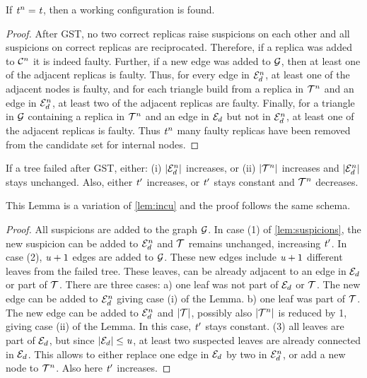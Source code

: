 \begin{lemma}
  \label{lem:found}
  If $\mathit{t}^n=\mathit{t}$, then a working configuration is found.
\end{lemma}
\begin{proof}
  After GST, no two correct replicas raise suspicions on each other and all suspicions on correct replicas are reciprocated. Therefore, if a replica was added to $\mathcal{C}^n$ it is indeed faulty.
  Further, if a new edge was added to $\mathcal{G}$, then at least one of the adjacent replicas is faulty.
  Thus, for every edge in $\mathcal{E}_d^n$, at least one of the adjacent nodes is faulty, and for each triangle build from a replica in $\mathcal{T}^n$ and an edge in $\mathcal{E}_d^n$, at least two of the adjacent replicas are faulty.
  Finally, for a triangle in $\mathcal{G}$ containing a replica in $\mathcal{T}^n$ and an edge in $\mathcal{E}_d$ but not in $\mathcal{E}_d^n$, at least one of the adjacent replicas is faulty.
  Thus $\mathit{t}^n$ many faulty replicas have been removed from the candidate set for internal nodes.
\end{proof}



\begin{lemma}
  \label{lem:incugst}
  If a tree failed after GST, either: (i) $|\mathcal{E}_d^n|$ increases, or (ii) $|\mathcal{T}^n|$ increases and $|\mathcal{E}_d^n|$ stays unchanged.
  Also, either $\mathit{t}'$ increases, or $\mathit{t}'$ stays constant and $\mathcal{T}^n$ decreases.
\end{lemma}
This Lemma is a variation of \cref{lem:incu} and the proof follows the same schema.

\begin{proof}
  All suspicions are added to the graph $\mathcal{G}$.
  In case (1) of \cref{lem:suspicions}, the new suspicion can be added to $\mathcal{E}_d^n$ and $\mathcal{T}$ remains unchanged, increasing $\mathit{t}'$.
  In case (2), $\mathit{u}+1$ edges are added to $\mathcal{G}$.
  These new edges include $\mathit{u}+1$ different leaves from the failed tree. These leaves, can be already adjacent to an edge in $\mathcal{E}_d$ or part of $\mathcal{T}$.
  There are three cases:
a) one leaf was not part of $\mathcal{E}_d$ or $\mathcal{T}$. The new edge can be added to $\mathcal{E}_d^n$ giving case (i) of the Lemma.
b) one leaf was part of $\mathcal{T}$. The new edge can be added to $\mathcal{E}_d^n$ and $|\mathcal{T}|$, possibly also $|\mathcal{T}^n|$ is reduced by 1, giving case (ii) of the Lemma. In this case, $\mathit{t}'$ stays constant.
(3) all leaves are part of $\mathcal{E}_d$, but since $|\mathcal{E}_d|\leq \mathit{u}$, at least two suspected leaves are already connected in $\mathcal{E}_d$. This allows to either replace one edge in $\mathcal{E}_d$ by two in $\mathcal{E}_d^n$, or add a new node to $\mathcal{T}^n$. Also here $\mathit{t}'$ increases.
\end{proof}

